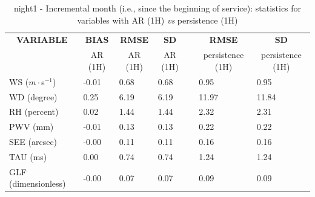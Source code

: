 \begin{table}[]
\begin{center}
\begin{tabular}{|l|l|l|l|l|l|l|}
\hline
\multicolumn{1}{|c|}{\cellcolor[HTML]{C0C0C0}\textbf{VARIABLE}} & \multicolumn{1}{c|}{\cellcolor[HTML]{C0C0C0}\textbf{BIAS}} & \multicolumn{1}{c|}{\cellcolor[HTML]{C0C0C0}\textbf{RMSE}} & \multicolumn{1}{c|}{\cellcolor[HTML]{C0C0C0}\textbf{SD}} & & \multicolumn{1}{c|}{\cellcolor[HTML]{C0C0C0}\textbf{RMSE}} & \multicolumn{1}{c|}{\cellcolor[HTML]{C0C0C0}\textbf{SD}}\\
\multicolumn{1}{|c|}{\cellcolor[HTML]{C0C0C0}} & \multicolumn{1}{c|}{\cellcolor[HTML]{C0C0C0}AR (1H)} & \multicolumn{1}{c|}{\cellcolor[HTML]{C0C0C0}AR (1H)} & \multicolumn{1}{c|}{\cellcolor[HTML]{C0C0C0}AR (1H)} & & \multicolumn{1}{c|}{\cellcolor[HTML]{C0C0C0} persistence (1H)} & \multicolumn{1}{c|}{\cellcolor[HTML]{C0C0C0}persistence (1H)}\\\hline
\cellcolor[HTML]{C0C0C0}WS ($m\cdot$s$^{-1}$) &     -0.01  &      0.68  &      0.68  & &      0.95  &      0.95\\
\cellcolor[HTML]{C0C0C0}WD (degree)           &      0.25  &      6.19  &      6.19  & &     11.97  &     11.84\\
\cellcolor[HTML]{C0C0C0}RH (percent)          &      0.02  &      1.44  &      1.44  & &      2.32  &      2.31\\
\cellcolor[HTML]{C0C0C0}PWV (mm)              &     -0.01 &      0.13 &      0.13 & &      0.22 &      0.22\\
\cellcolor[HTML]{C0C0C0}SEE (arcsec)          &     -0.00 &      0.11 &      0.11 & &      0.16 &      0.16\\
\cellcolor[HTML]{C0C0C0}TAU (ms)              &      0.00 &      0.74 &      0.74 & &      1.24 &      1.24\\
\cellcolor[HTML]{C0C0C0}GLF (dimensionless)   &     -0.00 &      0.07 &      0.07 & &      0.09 &      0.09\\
\hline
\end{tabular}
\caption{night1 - Incremental month (i.e., since the beginning of service): statistics for variables with AR (1H) \textit{vs} persistence (1H)}\label{tab:night1:statAFT:IM}
\end{center}
\end{table}

\clearpage
